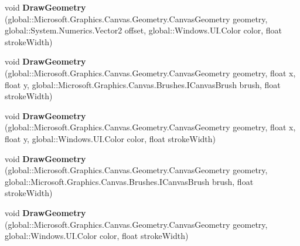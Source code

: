 \begin{DoxyCompactItemize}
\item 
\mbox{\label{interface_microsoft_1_1_graphics_1_1_canvas_1_1_i_canvas_drawing_session_ac3f9cff646e59b7981fc11b3494504be}} 
void {\bfseries Draw\+Geometry} (global\+::\+Microsoft.\+Graphics.\+Canvas.\+Geometry.\+Canvas\+Geometry geometry, global\+::\+System.\+Numerics.\+Vector2 offset, global\+::\+Windows.\+U\+I.\+Color color, float stroke\+Width)
\item 
\mbox{\label{interface_microsoft_1_1_graphics_1_1_canvas_1_1_i_canvas_drawing_session_a13ed7fcb5522a18a9f6b2ab39420b568}} 
void {\bfseries Draw\+Geometry} (global\+::\+Microsoft.\+Graphics.\+Canvas.\+Geometry.\+Canvas\+Geometry geometry, float x, float y, global\+::\+Microsoft.\+Graphics.\+Canvas.\+Brushes.\+I\+Canvas\+Brush brush, float stroke\+Width)
\item 
\mbox{\label{interface_microsoft_1_1_graphics_1_1_canvas_1_1_i_canvas_drawing_session_af7fba73a063114677303044d57a07932}} 
void {\bfseries Draw\+Geometry} (global\+::\+Microsoft.\+Graphics.\+Canvas.\+Geometry.\+Canvas\+Geometry geometry, float x, float y, global\+::\+Windows.\+U\+I.\+Color color, float stroke\+Width)
\item 
\mbox{\label{interface_microsoft_1_1_graphics_1_1_canvas_1_1_i_canvas_drawing_session_a172a412716c5be1cdcbdfcc468f103a0}} 
void {\bfseries Draw\+Geometry} (global\+::\+Microsoft.\+Graphics.\+Canvas.\+Geometry.\+Canvas\+Geometry geometry, global\+::\+Microsoft.\+Graphics.\+Canvas.\+Brushes.\+I\+Canvas\+Brush brush, float stroke\+Width)
\item 
\mbox{\label{interface_microsoft_1_1_graphics_1_1_canvas_1_1_i_canvas_drawing_session_a86cf58c7718a6a862f8e7ecb5d2624cf}} 
void {\bfseries Draw\+Geometry} (global\+::\+Microsoft.\+Graphics.\+Canvas.\+Geometry.\+Canvas\+Geometry geometry, global\+::\+Windows.\+U\+I.\+Color color, float stroke\+Width)
\item 
\mbox{\label{interface_microsoft_1_1_graphics_1_1_canvas_1_1_i_canvas_drawing_session_a77054d34a841a6c3d2d6c6f56d628aae}} 

\end{DoxyCompactItemize}
